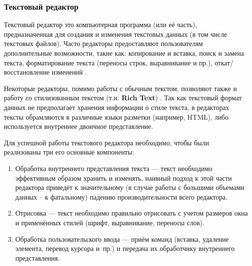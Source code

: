 \documentclass{fefu}
\begin{document}
			\subsubsection{Текстовый редактор}
				\par Текстовый редактор это компьютерная программа (или её часть), 
				предназначенная для создания и изменения текстовых данных (в том числе 
				текстовых файлов). Часто редакторы предоставляют пользователям дополнительные 
				возможности, такие как: копирование и вставка, поиск и замена текста, 
				форматирование текста (переносы строк, выравнивание и пр.), 
				откат/восстановление изменений \cite{WhatIsATextEditor}. 
				\par Некоторые редакторы, помимо работы с обычным текстом, позволяют также и
				работу со стилизованным текстом (т.н. \textbf{Rich Text}) 
				\cite{DiffBetweenTextFormats}. Так как текстовый формат данных не предполагает
				хранения информации о стиле текста, в редакторах тексты обрамляются в различные
				языки разметки (например, HTML), либо используется внутреннее двоичное 
				представление.
				\par Для успешной работы текстового редактора необходимо, чтобы были
				реализованы три его основные компоненты: \cite{CraftOfTextEditing}
				\begin{enumerate}
					\item Обработка внутреннего представления текста --- текст необходимо
					эффективным образом хранить и изменять, наивный подход к этой части
					редактора приведёт к значительному (в случае работы с большими объемами
					данных -- к фатальному) падению производительности всего редактора.
					\item Отрисовка --- текст необходимо правильно отрисовать с учетом размеров
					окна и применённых стилей (шрифт, выравнивание, переносы слов).
					\item Обработка пользовательского ввода --- приём команд
					(вставка, удаление элемента, перевод курсора и~пр.) и передача их
					обработчику внутреннего представления.
				\end{enumerate}
\end{document}
